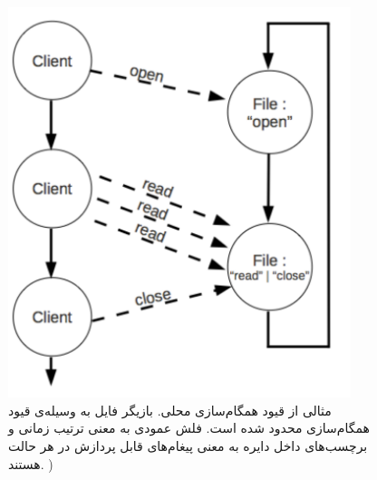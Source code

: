 \begin{figure}
    \begin{center}
	\includegraphics[width=10cm]{3-RelatedWork/Figures/LSC.pdf}
    \end{center}
    \caption{\label{fig:lsc} مثالی از قیود همگام‌سازی محلی. بازیگر فایل به وسیله‌ی قیود همگام‌سازی محدود شده است. فلش عمودی به معنی ترتیب زمانی و برچسب‌های داخل دایره به معنی پیغام‌های قابل پردازش در هر حالت هستند. ) }
\end{figure}
